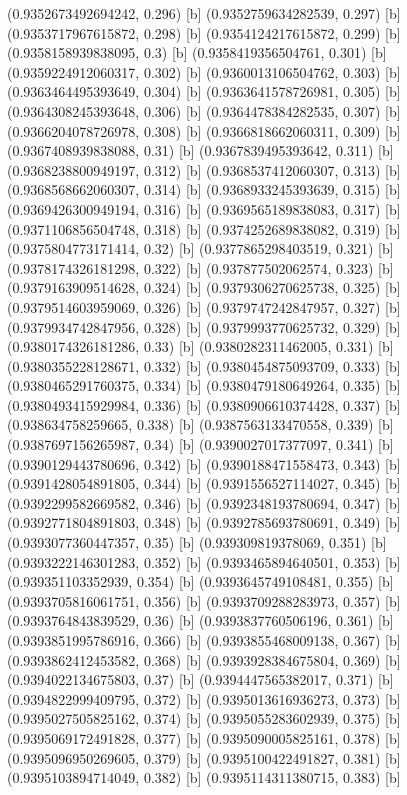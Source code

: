 {{{(0.9352673492694242, 0.296) [b] 
(0.9352759634282539, 0.297) [b] 
(0.9353717967615872, 0.298) [b] 
(0.9354124217615872, 0.299) [b] 
(0.9358158939838095, 0.3) [b] 
(0.9358419356504761, 0.301) [b] 
(0.9359224912060317, 0.302) [b] 
(0.9360013106504762, 0.303) [b] 
(0.9363464495393649, 0.304) [b] 
(0.9363641578726981, 0.305) [b] 
(0.9364308245393648, 0.306) [b] 
(0.9364478384282535, 0.307) [b] 
(0.9366204078726978, 0.308) [b] 
(0.9366818662060311, 0.309) [b] 
(0.9367408939838088, 0.31) [b] 
(0.9367839495393642, 0.311) [b] 
(0.9368238800949197, 0.312) [b] 
(0.9368537412060307, 0.313) [b] 
(0.9368568662060307, 0.314) [b] 
(0.9368933245393639, 0.315) [b] 
(0.9369426300949194, 0.316) [b] 
(0.9369565189838083, 0.317) [b] 
(0.9371106856504748, 0.318) [b] 
(0.9374252689838082, 0.319) [b] 
(0.9375804773171414, 0.32) [b] 
(0.9377865298403519, 0.321) [b] 
(0.9378174326181298, 0.322) [b] 
(0.937877502062574, 0.323) [b] 
(0.9379163909514628, 0.324) [b] 
(0.9379306270625738, 0.325) [b] 
(0.9379514603959069, 0.326) [b] 
(0.9379747242847957, 0.327) [b] 
(0.9379934742847956, 0.328) [b] 
(0.9379993770625732, 0.329) [b] 
(0.9380174326181286, 0.33) [b] 
(0.9380282311462005, 0.331) [b] 
(0.9380355228128671, 0.332) [b] 
(0.9380454875093709, 0.333) [b] 
(0.9380465291760375, 0.334) [b] 
(0.9380479180649264, 0.335) [b] 
(0.9380493415929984, 0.336) [b] 
(0.9380906610374428, 0.337) [b] 
(0.938634758259665, 0.338) [b] 
(0.9387563133470558, 0.339) [b] 
(0.9387697156265987, 0.34) [b] 
(0.9390027017377097, 0.341) [b] 
(0.9390129443780696, 0.342) [b] 
(0.9390188471558473, 0.343) [b] 
(0.9391428054891805, 0.344) [b] 
(0.9391556527114027, 0.345) [b] 
(0.9392299582669582, 0.346) [b] 
(0.9392348193780694, 0.347) [b] 
(0.9392771804891803, 0.348) [b] 
(0.9392785693780691, 0.349) [b] 
(0.9393077360447357, 0.35) [b] 
(0.939309819378069, 0.351) [b] 
(0.9393222146301283, 0.352) [b] 
(0.9393465894640501, 0.353) [b] 
(0.939351103352939, 0.354) [b] 
(0.9393645749108481, 0.355) [b] 
(0.9393705816061751, 0.356) [b] 
(0.9393709288283973, 0.357) [b] 
(0.9393764843839529, 0.36) [b] 
(0.9393837760506196, 0.361) [b] 
(0.9393851995786916, 0.366) [b] 
(0.9393855468009138, 0.367) [b] 
(0.9393862412453582, 0.368) [b] 
(0.9393928384675804, 0.369) [b] 
(0.9394022134675803, 0.37) [b] 
(0.9394447565382017, 0.371) [b] 
(0.9394822999409795, 0.372) [b] 
(0.9395013616936273, 0.373) [b] 
(0.9395027505825162, 0.374) [b] 
(0.9395055283602939, 0.375) [b] 
(0.9395069172491828, 0.377) [b] 
(0.9395090005825161, 0.378) [b] 
(0.9395096950269605, 0.379) [b] 
(0.9395100422491827, 0.381) [b] 
(0.9395103894714049, 0.382) [b] 
(0.9395114311380715, 0.383) [b] 
}}}
